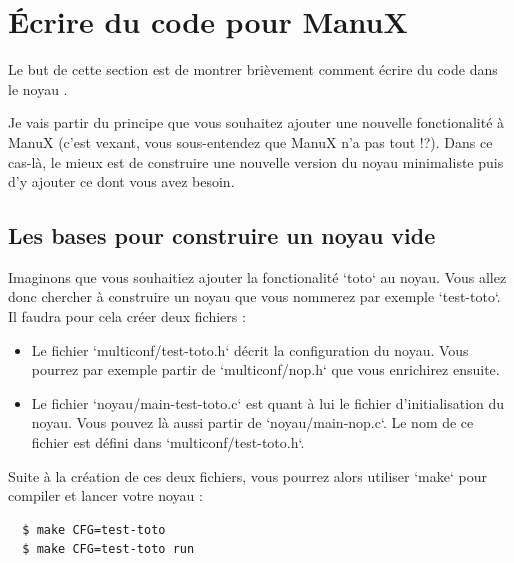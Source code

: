 %
\section{Écrire du code pour ManuX}

   Le but de cette section est de montrer brièvement comment écrire du
code dans le noyau \manux.

   Je vais partir du principe que vous souhaitez ajouter une nouvelle
fonctionalité à ManuX (c'est vexant, vous sous-entendez que ManuX n'a
pas tout !?). Dans ce cas-là, le mieux est de construire une nouvelle
version du noyau minimaliste puis d'y ajouter ce dont vous avez
besoin.

%
\subsection{Les bases pour construire un noyau vide}

   Imaginons que vous souhaitiez ajouter la fonctionalité `toto` au
noyau. Vous allez donc chercher à construire un noyau que vous
nommerez par exemple `test-toto`. Il faudra pour cela créer deux
fichiers :

\begin{itemize}
   \item Le fichier `multiconf/test-toto.h` décrit la configuration du
     noyau. Vous pourrez par exemple partir de `multiconf/nop.h` que
     vous enrichirez ensuite.
   \item Le fichier `noyau/main-test-toto.c` est quant à lui le
     fichier d'initialisation du noyau. Vous pouvez là aussi partir de
     `noyau/main-nop.c`. Le nom de ce fichier est défini dans
     `multiconf/test-toto.h`.
\end{itemize}

   Suite à la création de ces deux fichiers, vous pourrez alors
utiliser `make` pour compiler et lancer votre noyau :

\begin{lstlisting}
  $ make CFG=test-toto
  $ make CFG=test-toto run
\end{lstlisting}

